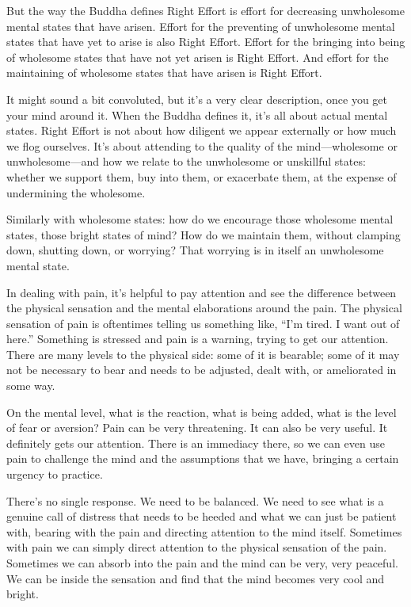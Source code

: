 But the way the Buddha defines Right Effort is effort for decreasing
unwholesome mental states that have arisen. Effort for the preventing of
unwholesome mental states that have yet to arise is also Right Effort.
Effort for the bringing into being of wholesome states that have not yet
arisen is Right Effort. And effort for the maintaining of wholesome
states that have arisen is Right Effort.

It might sound a bit convoluted, but it’s a very clear description, once
you get your mind around it. When the Buddha defines it, it’s all about
actual mental states. Right Effort is not about how diligent we appear
externally or how much we flog ourselves. It’s about attending to the
quality of the mind—wholesome or unwholesome—and how we relate to the
unwholesome or unskillful states: whether we support them, buy into
them, or exacerbate them, at the expense of undermining the wholesome.

Similarly with wholesome states: how do we encourage those wholesome
mental states, those bright states of mind? How do we maintain them,
without clamping down, shutting down, or worrying? That worrying is in
itself an unwholesome mental state.

In dealing with pain, it’s helpful to pay attention and see the
difference between the physical sensation and the mental elaborations
around the pain. The physical sensation of pain is oftentimes telling us
something like, “I’m tired. I want out of here.” Something is stressed
and pain is a warning, trying to get our attention. There are many
levels to the physical side: some of it is bearable; some of it may not
be necessary to bear and needs to be adjusted, dealt with, or
ameliorated in some way.

On the mental level, what is the reaction, what is being added, what is
the level of fear or aversion? Pain can be very threatening. It can also
be very useful. It definitely gets our attention. There is an immediacy
there, so we can even use pain to challenge the mind and the assumptions
that we have, bringing a certain urgency to practice.

There’s no single response. We need to be balanced. We need to see what
is a genuine call of distress that needs to be heeded and what we can
just be patient with, bearing with the pain and directing attention to
the mind itself. Sometimes with pain we can simply direct attention to
the physical sensation of the pain. Sometimes we can absorb into the
pain and the mind can be very, very peaceful. We can be inside the
sensation and find that the mind becomes very cool and bright.

